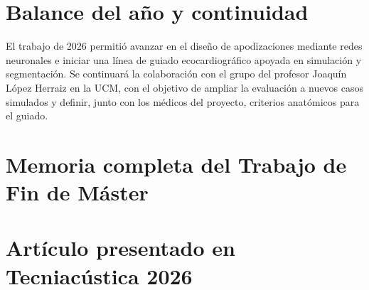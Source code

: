 \documentclass[10pt,a4paper]{article}
\newcommand{\pendiente}[1]{\par\begingroup\raggedright\noindent\textcolor{gray}{\textit{[Pendiente: #1]}}\par\endgroup}
\begin{document}
\section{Balance del año y continuidad}\label{sec:conclusiones}
El trabajo de 2026 permitió avanzar en el diseño de apodizaciones mediante redes neuronales e iniciar una línea de guiado ecocardiográfico apoyada en simulación y segmentación. Se continuará la colaboración con el grupo del profesor Joaquín López Herraiz en la UCM, con el objetivo de ampliar la evaluación a nuevos casos simulados y definir, junto con los médicos del proyecto, criterios anatómicos para el guiado.

\FloatBarrier
{\raggedright\printbibliography[heading=bibintoc,title={Referencias}]\par}


\appendix
\clearpage
\section{Memoria completa del Trabajo de Fin de Máster}\label{anexo:tfm}


\clearpage
\section{Artículo presentado en Tecniacústica 2026}\label{anexo:tecniacustica}


\end{document}
